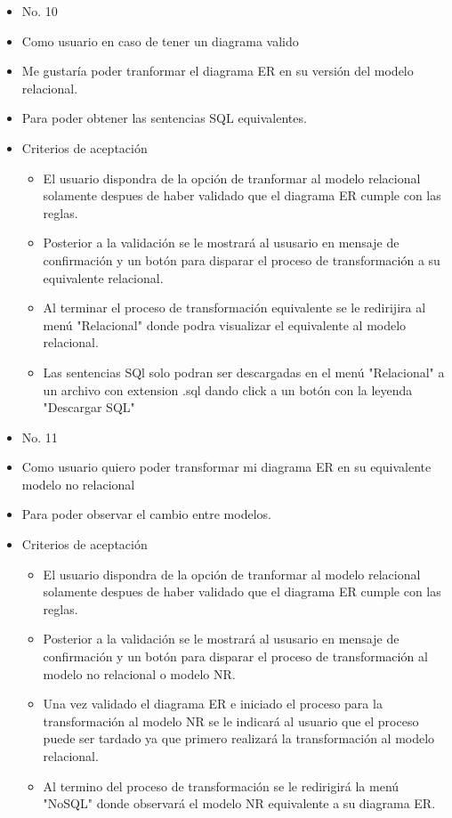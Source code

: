 \begin{itemize}
	\item No. 10
	\item Como usuario en caso de tener un diagrama valido
	\item Me gustaría poder tranformar el diagrama ER en su versión del modelo relacional.
	\item Para poder obtener las sentencias SQL equivalentes.
	\item Criterios de aceptación
	\begin{itemize}
		\item El usuario dispondra de la opción de tranformar al modelo relacional solamente despues de haber validado que el diagrama ER cumple con las reglas.
		\item Posterior a la validación se le mostrará al ususario en mensaje de confirmación y un botón para disparar el proceso de transformación a su equivalente relacional.
		\item Al terminar el proceso de transformación equivalente se le redirijira al menú "Relacional" donde podra visualizar el equivalente al modelo relacional.
		\item Las sentencias SQl solo podran ser descargadas en el menú "Relacional" a un archivo con extension .sql dando click a un botón con la leyenda "Descargar SQL"
	\end{itemize}
\end{itemize}

\begin{itemize}
	\item No. 11
	\item Como usuario quiero poder transformar mi diagrama ER en su equivalente modelo no relacional
	\item Para poder observar el cambio entre modelos.
	\item Criterios de aceptación
	\begin{itemize}
		\item El usuario dispondra de la opción de tranformar al modelo relacional solamente despues de haber validado que el diagrama ER cumple con las reglas.
		\item Posterior a la validación se le mostrará al ususario en mensaje de confirmación y un botón para disparar el proceso de transformación al modelo no relacional o modelo NR.
		\item Una vez validado el diagrama ER e iniciado el proceso para la transformación al modelo NR se le indicará al usuario que el proceso puede ser tardado ya que primero realizará la transformación al modelo relacional.
		\item Al termino del proceso de transformación se le redirigirá la menú "NoSQL" donde observará el modelo NR equivalente a su diagrama ER.
	\end{itemize}
\end{itemize}

